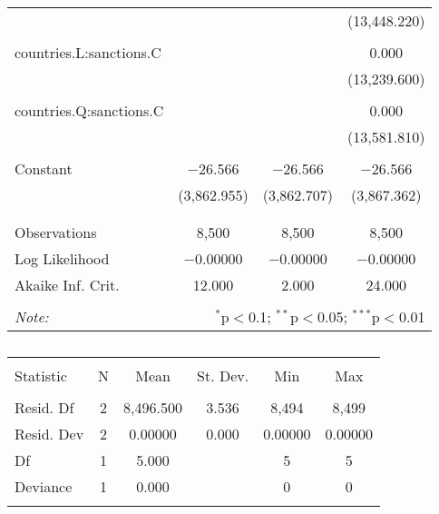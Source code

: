 \begin{table}[!htbp]
\begin{tabular}{@{\extracolsep{5pt}}lccc}
  &  &  & (13,448.220) \\ 
  & & & \\ 
 countries.L:sanctions.C &  &  & 0.000 \\ 
  &  &  & (13,239.600) \\ 
  & & & \\ 
 countries.Q:sanctions.C &  &  & 0.000 \\ 
  &  &  & (13,581.810) \\ 
  & & & \\ 
 Constant & $-$26.566 & $-$26.566 & $-$26.566 \\ 
  & (3,862.955) & (3,862.707) & (3,867.362) \\ 
  & & & \\ 
\hline \\[-1.8ex] 
Observations & 8,500 & 8,500 & 8,500 \\ 
Log Likelihood & $-$0.00000 & $-$0.00000 & $-$0.00000 \\ 
Akaike Inf. Crit. & 12.000 & 2.000 & 24.000 \\ 
\hline 
\hline \\[-1.8ex] 
\textit{Note:}  & \multicolumn{3}{r}{$^{*}$p$<$0.1; $^{**}$p$<$0.05; $^{***}$p$<$0.01} \\ 
\end{tabular} 
\end{table} 

\begin{table}[!htbp] \centering 
  \caption{} 
  \label{} 
\begin{tabular}{@{\extracolsep{5pt}}lccccc} 
\\[-1.8ex]\hline 
\hline \\[-1.8ex] 
Statistic & \multicolumn{1}{c}{N} & \multicolumn{1}{c}{Mean} & \multicolumn{1}{c}{St. Dev.} & \multicolumn{1}{c}{Min} & \multicolumn{1}{c}{Max} \\ 
\hline \\[-1.8ex] 
Resid. Df & 2 & 8,496.500 & 3.536 & 8,494 & 8,499 \\ 
Resid. Dev & 2 & 0.00000 & 0.000 & 0.00000 & 0.00000 \\ 
Df & 1 & 5.000 &  & 5 & 5 \\ 
Deviance & 1 & 0.000 &  & 0 & 0 \\ 
\hline \\[-1.8ex] 
\end{tabular} 
\end{table}  
